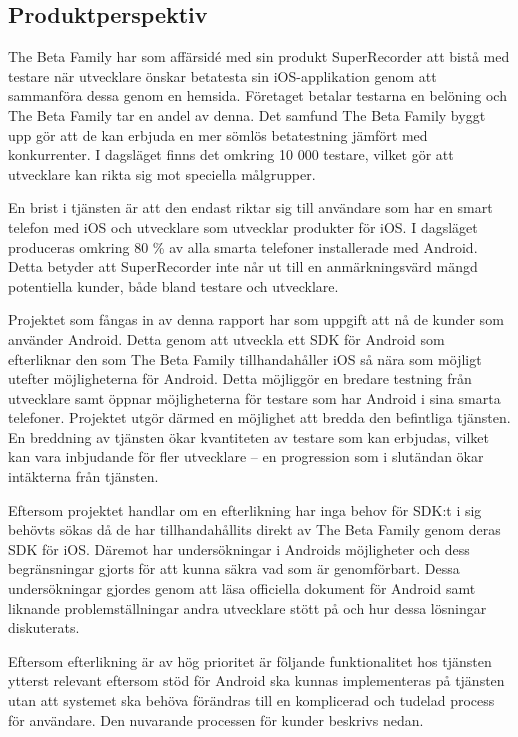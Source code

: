 \subsection{Produktperspektiv}
\label{subsec:perspective}

The Beta Family har som affärsidé med sin produkt SuperRecorder att bistå med testare när utvecklare önskar betatesta sin iOS-applikation genom att sammanföra dessa genom en hemsida. Företaget betalar testarna en belöning och The Beta Family tar en andel av denna. Det samfund The Beta Family byggt upp gör att de kan erbjuda en mer sömlös betatestning jämfört med konkurrenter. I dagsläget finns det omkring 10 000 testare, vilket gör att utvecklare kan rikta sig mot speciella målgrupper.

En brist i tjänsten är att den endast riktar sig till användare som har en smart telefon med iOS och utvecklare som utvecklar produkter för iOS. I dagsläget produceras omkring 80 \% av alla smarta telefoner installerade med Android\parencite{ http://www.idc.com/getdoc.jsp?containerId=prUS24442013}. Detta betyder att SuperRecorder inte når ut till en anmärkningsvärd mängd potentiella kunder, både bland testare och utvecklare.

Projektet som fångas in av denna rapport har som uppgift att nå de kunder som använder Android. Detta genom att utveckla ett SDK för Android som efterliknar den som The Beta Family tillhandahåller iOS så nära som möjligt utefter möjligheterna för Android. Detta möjliggör en bredare testning från utvecklare samt öppnar möjligheterna för testare som har Android i sina smarta telefoner. Projektet utgör därmed en möjlighet att bredda den befintliga tjänsten. En breddning av tjänsten ökar kvantiteten av testare som kan erbjudas, vilket kan vara inbjudande för fler utvecklare – en progression som i slutändan ökar intäkterna från tjänsten.

Eftersom projektet handlar om en efterlikning har inga behov för SDK:t i sig behövts sökas då de har tillhandahållits direkt av The Beta Family genom deras SDK för iOS. Däremot har undersökningar i Androids möjligheter och dess begränsningar gjorts för att kunna säkra vad som är genomförbart. Dessa undersökningar gjordes genom att läsa officiella dokument för Android samt liknande problemställningar andra utvecklare stött på och hur dessa lösningar diskuterats.

Eftersom efterlikning är av hög prioritet är följande funktionalitet hos tjänsten ytterst relevant eftersom stöd för Android ska kunnas implementeras på tjänsten utan att systemet ska behöva förändras till en komplicerad och tudelad process för användare. Den nuvarande processen för kunder beskrivs nedan.

